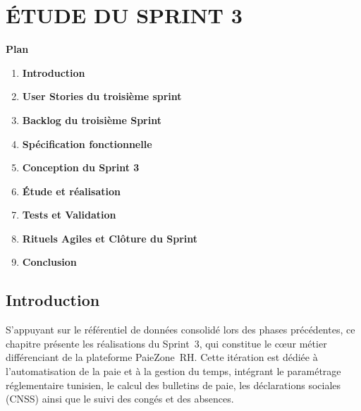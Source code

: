 \newpage
\chapter{ÉTUDE DU SPRINT 3}

\noindent \textbf{\Large Plan}
\vspace{0.8cm}

\begin{enumerate}[label=\textbf{\arabic*}, leftmargin=1.5cm, labelsep=0.8cm]
    \item[] \hspace*{-1.5cm}\textbf{Introduction}                        \dotfill \pageref{sec:s3-intro}
    \item \textbf{User Stories du troisième sprint}                       \dotfill \pageref{sec:s3-userstories}
    \item \textbf{Backlog du troisième Sprint}                            \dotfill \pageref{sec:s3-backlog}
    \item \textbf{Spécification fonctionnelle}                            \dotfill \pageref{sec:s3-specification}
    \item \textbf{Conception du Sprint 3}                                 \dotfill \pageref{sec:s3-conception}
    \item \textbf{Étude et réalisation}                                   \dotfill \pageref{sec:s3-realisation}
    \item \textbf{Tests et Validation}                                    \dotfill \pageref{sec:s3-tests}
    \item \textbf{Rituels Agiles et Clôture du Sprint}                    \dotfill \pageref{sec:s3-rituels}
    \item[] \hspace*{-1.5cm}\textbf{Conclusion}                          \dotfill \pageref{sec:s3-conclusion}
\end{enumerate}
\vfill
\newpage

\section*{Introduction}
\label{sec:s3-intro}

S'appuyant sur le référentiel de données consolidé lors des phases
précédentes, ce chapitre présente les réalisations du Sprint~3, qui
constitue le c\oe{}ur métier différenciant de la plateforme PaieZone~RH.
Cette itération est dédiée à l'automatisation de la paie et à la gestion
du temps, intégrant le paramétrage réglementaire tunisien, le calcul des
bulletins de paie, les déclarations sociales (CNSS) ainsi que le suivi
des congés et des absences.

